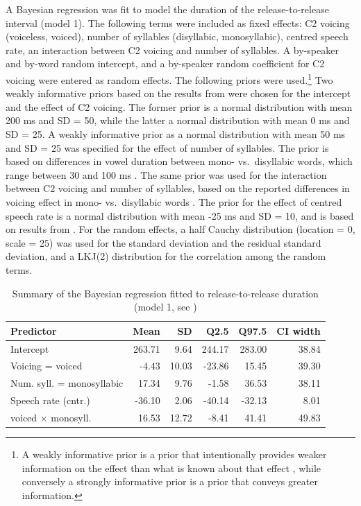\documentclass[12pt,a4paper,]{article}
\begin{document}
A Bayesian regression was fit to model the duration of the
release-to-release interval (model 1). The following terms were included
as fixed effects: C2 voicing (voiceless, voiced), number of syllables
(disyllabic, monosyllabic), centred speech rate, an interaction between
C2 voicing and number of syllables. A by-speaker and by-word random
intercept, and a by-speaker random coefficient for C2 voicing were
entered as random effects. The following priors were
used.\footnote{A weakly informative prior is a prior that intentionally provides weaker information on the effect than what is known about that effect \citep{gelman2006a}, while conversely a strongly informative prior is a prior that conveys greater information.}
Two weakly informative priors based on the results from
\citet{coretta2019k} were chosen for the intercept and the effect of C2
voicing. The former prior is a normal distribution with mean 200 ms and
SD = 50, while the latter a normal distribution with mean 0 ms and SD =
25. A weakly informative prior as a normal distribution with mean 50 ms
and SD = 25 was specified for the effect of number of syllables. The
prior is based on differences in vowel duration between mono-
vs.~disyllabic words, which range between 30 and 100 ms
\citep{sharf1962, klatt1973}. The same prior was used for the
interaction between C2 voicing and number of syllables, based on the
reported differences in voicing effect in mono- vs.~disyllabic words
\citep{sharf1962, klatt1973}. The prior for the effect of centred speech
rate is a normal distribution with mean -25 ms and SD = 10, and is based
on results from \citet{coretta2019k}. For the random effects, a half
Cauchy distribution (location = 0, scale = 25) was used for the standard
deviation and the residual standard deviation, and a LKJ(2) distribution
for the correlation among the random terms.

\begin{table}

\caption{\label{tab:rr-1-table}Summary of the Bayesian regression fitted to release-to-release duration (model 1, see )}
\centering
\fontsize{8}{10}\selectfont
\begin{tabular}[t]{lrrrrr}
\toprule
Predictor & Mean & SD & Q2.5 & Q97.5 & CI width\\
\midrule
Intercept & 263.71 & 9.64 & 244.17 & 283.00 & 38.84\\
Voicing = voiced & -4.43 & 10.03 & -23.86 & 15.45 & 39.30\\
Num. syll. = monosyllabic & 17.34 & 9.76 & -1.58 & 36.53 & 38.11\\
Speech rate (cntr.) & -36.10 & 2.06 & -40.14 & -32.13 & 8.01\\
voiced × monosyll. & 16.53 & 12.72 & -8.41 & 41.41 & 49.83\\
\bottomrule
\end{tabular}
\end{table}
\end{document}
